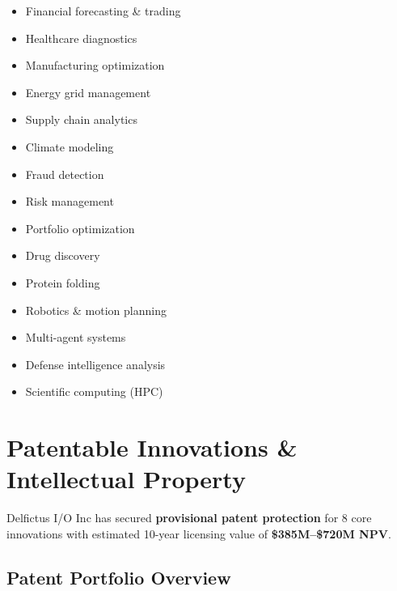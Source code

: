 \documentclass[11pt,letterpaper]{article}
\begin{document}
\begin{multicols}{2}
\begin{itemize}[leftmargin=*]
    \item Financial forecasting \& trading
    \item Healthcare diagnostics
    \item Manufacturing optimization
    \item Energy grid management
    \item Supply chain analytics
    \item Climate modeling
    \item Fraud detection
    \item Risk management
    \item Portfolio optimization
    \item Drug discovery
    \item Protein folding
    \item Robotics \& motion planning
    \item Multi-agent systems
    \item Defense intelligence analysis
    \item Scientific computing (HPC)
\end{itemize}
\end{multicols}

\newpage

\section{Patentable Innovations \& Intellectual Property}

Delfictus I/O Inc has secured \textbf{provisional patent protection} for 8 core innovations with estimated 10-year licensing value of \textbf{\$385M--\$720M NPV}.

\subsection{Patent Portfolio Overview}
\end{document}
